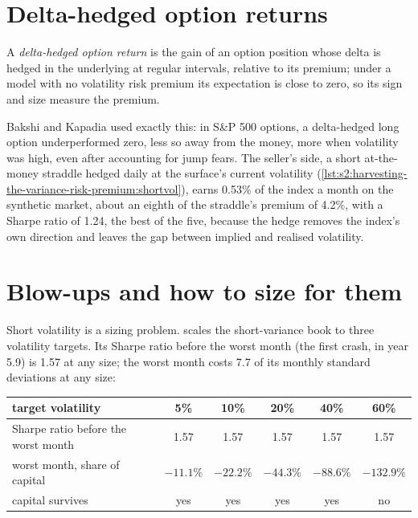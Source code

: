 \section{Delta-hedged option returns}

\begin{definition}\label{def:s2:harvesting-the-variance-risk-premium:hedged}
A \emph{delta-hedged option return} is the gain of an option position whose delta is hedged in the underlying at
regular intervals, relative to its premium; under a model with no volatility risk premium its expectation is close to zero, so its sign and size measure
the premium.
\end{definition}

Bakshi and Kapadia used exactly this: in S\&P 500 options, a delta-hedged long option underperformed zero, less so away from the money, more when
volatility was high, even after accounting for jump fears. The seller's side, a short at-the-money straddle hedged daily at the surface's current
volatility (\cref{lst:s2:harvesting-the-variance-risk-premium:shortvol}), earns 0.53\% of the index a month on the synthetic market, about an eighth of the
straddle's premium of 4.2\%, with a Sharpe ratio of 1.24, the best of the five, because the hedge removes the index's own direction and leaves the gap between
implied and realised volatility.

\section{Blow-ups and how to size for them}

Short volatility is a sizing problem.  scales the short-variance book to three volatility
targets. Its Sharpe ratio before the worst month (the first crash, in year 5.9) is 1.57 at any size; the worst month costs 7.7 of its monthly standard
deviations at any size:

\begin{center}
\small
\begin{tabular}{@{}lccccc@{}}
\toprule
target volatility & 5\% & 10\% & 20\% & 40\% & 60\%\\
\midrule
Sharpe ratio before the worst month & 1.57 & 1.57 & 1.57 & 1.57 & 1.57\\
worst month, share of capital & $-11.1\%$ & $-22.2\%$ & $-44.3\%$ & $-88.6\%$ & $-132.9\%$\\
capital survives & yes & yes & yes & yes & no\\
\bottomrule
\end{tabular}
\end{center}

